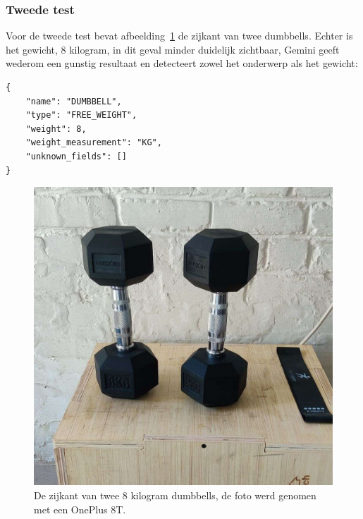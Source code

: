 \subsubsection{Tweede test}
Voor de tweede test bevat afbeelding~\ref{fig:test-twee} de zijkant van twee dumbbells.
Echter is het gewicht, 8 kilogram, in dit geval minder duidelijk zichtbaar,
Gemini geeft wederom een gunstig resultaat en detecteert zowel het onderwerp als het gewicht:
\begin{listing}[H]
    \begin{verbatim}
{
    "name": "DUMBBELL",
    "type": "FREE_WEIGHT",
    "weight": 8,
    "weight_measurement": "KG",
    "unknown_fields": []
}
    \end{verbatim}
\end{listing}

\begin{figure}[H]
    \begin{center}
        \includegraphics[scale=0.20]{images/prompt2-image}
        \caption{De zijkant van twee 8 kilogram dumbbells, de foto werd genomen met een OnePlus 8T.}
        \label{fig:test-twee}
    \end{center}
\end{figure}

